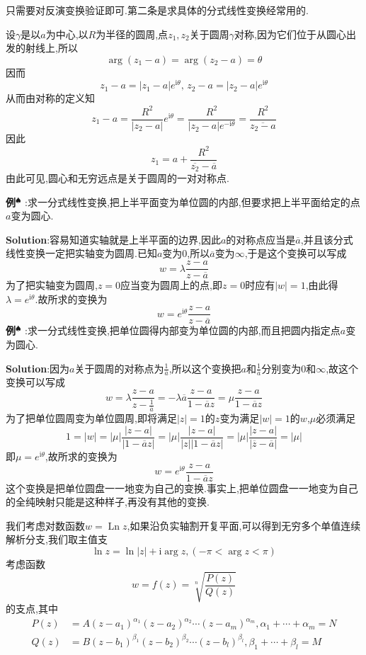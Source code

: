 只需要对反演变换验证即可.第二条是求具体的分式线性变换经常用的.\par
设$\gamma$是以$a$为中心,以$R$为半径的圆周,点$z_1,z_2$关于圆周$\gamma$对称,因为它们位于从圆心出发的射线上,所以
$$
\arg (z_1-a)=\arg (z_2-a)=\theta
$$
因而
$$
z_1-a=|z_1-a|e^{\mathrm{i}\theta},\,z_2-a=|z_2-a|e^{\mathrm{i}\theta}
$$
从而由对称的定义知
$$
z_1-a=\frac{R^2}{|z_2-a|}e^{\mathrm{i}\theta}=\frac{R^2}{|z_2-a|e^{-\mathrm{i}\theta}}=\frac{R^2}{\overline{z_2-a}}
$$
因此
$$
z_1=a+\frac{R^2}{\overline{z_2}-\overline{a}}
$$
由此可见,圆心和无穷远点是关于圆周的一对对称点.\par
\textbf{例}$^\spadesuit$ :求一分式线性变换,把上半平面变为单位圆的内部,但要求把上半平面给定的点$a$变为圆心.\par
\textbf{Solution}:容易知道实轴就是上半平面的边界,因此$a$的对称点应当是$\overline{a}$,并且该分式线性变换一定把实轴变为圆周.已知$a$变为0,所以$\overline{a}$变为$\infty$,于是这个变换可以写成
$$
w=\lambda\frac{z-a}{z-\overline{a}}
$$
为了把实轴变为圆周,$z=0$应当变为圆周上的点,即$z=0$时应有$|w|=1$,由此得$\lambda=e^{\mathrm{i}\theta}$.故所求的变换为
$$
w=e^{\mathrm{i}\theta}\frac{z-a}{z-\overline{a}}
$$
\qquad \textbf{例}$^\spadesuit$ :求一分式线性变换,把单位圆得内部变为单位圆的内部,而且把圆内指定点$a$变为圆心.\par
\textbf{Solution}:因为$a$关于圆周的对称点为$\frac{1}{\overline{a}}$,所以这个变换把$a$和$\frac{1}{\overline{a}}$分别变为$0$和$\infty$,故这个变换可以写成
$$
w=\lambda\frac{z-a}{z-\frac{1}{\overline{a}}}=-\lambda\overline{a}\frac{z-a}{1-\overline{a}z}=\mu\frac{z-a}{1-\overline{a}z}
$$
为了把单位圆周变为单位圆周,即将满足$|z|=1$的$z$变为满足$|w|=1$的$w$,$\mu$必须满足
$$
1=|w|=|\mu|\frac{|z-a|}{|1-\overline{a}z|}=|\mu|\frac{|z-a|}{|z||1-\overline{a}z|}=|\mu|\frac{|z-a|}{|\overline{z}-\overline{a}|}=|\mu|
$$
即$\mu=e^{\mathrm{i}\theta}$,故所求的变换为
$$
w=e^{\mathrm{i}\theta}\frac{z-a}{1-\overline{a}z}
$$
这个变换是把单位圆盘一一地变为自己的变换.事实上,把单位圆盘一一地变为自己的全纯映射只能是这种样子,再没有其他的变换.\par
我们考虑对数函数$w=\operatorname{Ln}z$,如果沿负实轴割开复平面,可以得到无穷多个单值连续解析分支,我们取主值支
$$
\ln z=\ln|z|+\mathrm{i}\arg z,(-\pi<\arg z<\pi)
$$
\qquad 考虑函数
$$
w=f(z)=\sqrt[n]{\frac{P(z)}{Q(z)}}
$$
的支点,其中
$$
\begin{aligned}
    P(z)&= A(z-a_1)^{\alpha_1}(z-a_2)^{\alpha_2}\cdots(z-a_m)^{\alpha_m},\alpha_1+\cdots+\alpha_m=N\\
    Q(z)&= B(z-b_1)^{\beta_1}(z-b_2)^{\beta_2}\cdots(z-b_l)^{\beta_l},\beta_1+\cdots+\beta_l=M
\end{aligned}
$$
